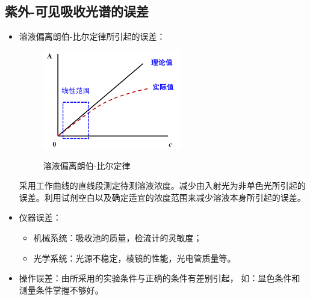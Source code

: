 \subsection{紫外-可见吸收光谱的误差}
\begin{itemize}
    \item  溶液偏离朗伯-比尔定律所引起的误差：
    \begin{figure}[h]
        \centering
        \includegraphics[width=6cm]{image/chp3_billlaw_offset.png}
        \label{fig:chp3offset}
        \caption{溶液偏离朗伯-比尔定律}
    \end{figure}
采用工作曲线的直线段测定待测溶液浓度。减少由入射光为非单色光所引起的误差。利用试剂空白以及确定适宜的浓度范围来减少溶液本身所引起的误差。
    \item  仪器误差：
    \begin{itemize}
        \item 机械系统：吸收池的质量，检流计的灵敏度；
        \item 光学系统：光源不稳定，棱镜的性能，光电管质量等。
    \end{itemize}
    \item  操作误差：由所采用的实验条件与正确的条件有差别引起，
    如：显色条件和测量条件掌握不够好。
\end{itemize}

